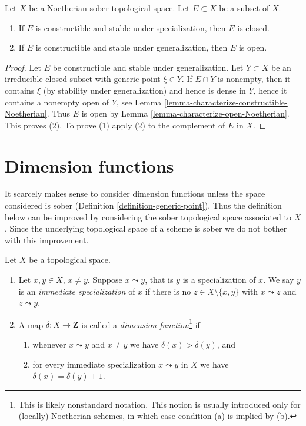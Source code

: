 \begin{lemma}
\label{lemma-characterize-closed-Noetherian}
Let $X$ be a Noetherian sober topological space.
Let $E \subset X$ be a subset of $X$.
\begin{enumerate}
\item If $E$ is constructible and stable under specialization, then
$E$ is closed.
\item If $E$ is constructible and stable under generalization, then
$E$ is open.
\end{enumerate}
\end{lemma}

\begin{proof}
Let $E$ be constructible and stable under generalization.
Let $Y \subset X$ be an irreducible closed subset with generic point
$\xi \in Y$. If $E \cap Y$ is nonempty, then it contains $\xi$ (by
stability under generalization) and hence is dense in $Y$, hence it
contains a nonempty open of $Y$, see
Lemma \ref{lemma-characterize-constructible-Noetherian}.
Thus $E$ is open by
Lemma \ref{lemma-characterize-open-Noetherian}.
This proves (2). To prove (1) apply (2) to the complement of $E$ in $X$.
\end{proof}









\section{Dimension functions}
\label{section-dimension-function}

\noindent
It scarcely makes sense to consider dimension functions unless the space
considered is sober (Definition \ref{definition-generic-point}). Thus the
definition below can be improved by considering the sober topological space
associated to $X$. Since the underlying topological space of a scheme
is sober we do not bother with this improvement.

\begin{definition}
\label{definition-dimension-function}
Let $X$ be a topological space.
\begin{enumerate}
\item  Let $x, y \in X$, $x \not = y$. Suppose $x \leadsto y$, that
is $y$ is a specialization of $x$.
We say $y$ is an {\it immediate specialization}
of $x$ if there is no
$z \in X \setminus \{x, y\}$ with $x \leadsto z$ and $z \leadsto y$.
\item A map $\delta : X \to \mathbf{Z}$ is called a
{\it dimension function}\footnote{This is likely nonstandard
notation. This notion is usually introduced only for (locally) Noetherian
schemes, in which case condition (a) is implied by (b).} if
\begin{enumerate}
\item whenever $x \leadsto y$ and $x \not = y$
we have $\delta(x) > \delta(y)$, and
\item for every immediate specialization $x \leadsto y$ in $X$
we have $\delta(x) = \delta(y) + 1$.
\end{enumerate}
\end{enumerate}
\end{definition}

